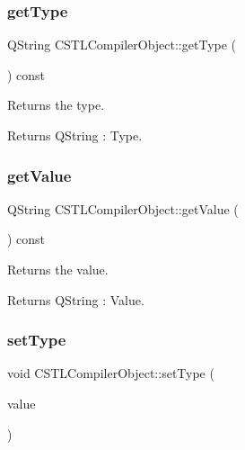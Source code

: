 \subsubsection{\texorpdfstring{get\+Type}{getType}}
{\footnotesize\ttfamily Q\+String C\+S\+T\+L\+Compiler\+Object\+::get\+Type (\begin{DoxyParamCaption}{ }\end{DoxyParamCaption}) const\hspace{0.3cm}{\ttfamily [slot]}}



Returns the type. 

\begin{DoxyReturn}{Returns}
Q\+String \+: Type. 
\end{DoxyReturn}
\mbox{\label{class_c_s_t_l_compiler_object_a3ee0eea5271717302cd4cb34720b656e}} 
\subsubsection{\texorpdfstring{get\+Value}{getValue}}
{\footnotesize\ttfamily Q\+String C\+S\+T\+L\+Compiler\+Object\+::get\+Value (\begin{DoxyParamCaption}{ }\end{DoxyParamCaption}) const\hspace{0.3cm}{\ttfamily [slot]}}



Returns the value. 

\begin{DoxyReturn}{Returns}
Q\+String \+: Value. 
\end{DoxyReturn}
\mbox{\label{class_c_s_t_l_compiler_object_a16ec55cd3515f6d72c79c565bcad9243}} 
\subsubsection{\texorpdfstring{set\+Type}{setType}}
{\footnotesize\ttfamily void C\+S\+T\+L\+Compiler\+Object\+::set\+Type (\begin{DoxyParamCaption}\item[{const Q\+String \&}]{value }\end{DoxyParamCaption})\hspace{0.3cm}{\ttfamily [slot]}}



